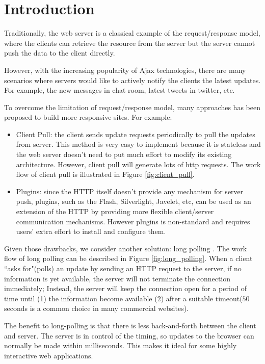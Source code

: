 \section {Introduction\\}
Traditionally, the web server is a classical example of the request/response 
model, where the clients can retrieve the resource from the server but the 
server cannot push the data to the client directly. 

However, with the increasing popularity of Ajax\cite{Ajax} technologies, there 
are many scenarios where servers would like to actively notify the clients the 
latest updates. For example, the new messages in chat room, latest tweets in 
twitter, etc.

To overcome the limitation of request/response model, many approaches has been 
proposed to build more responsive sites. For example:

\begin{itemize}
\item Client Pull: the client sends update requests periodically to pull the
updates from server. This method is very easy to implement because 
it is stateless and the web server doesn't need to put much effort to modify 
its existing architecture. However, client pull will generate lots of http requests.
The work flow of client pull is illustrated in Figure \ref{fig:client_pull}.

\item Plugins: since the HTTP itself doesn't provide any mechanism for server 
push, plugins, such as the Flash, Silverlight, Javelet, etc, can be used as an 
extension of the HTTP by providing more flexible client/server communication 
mechanisms. However plugins is non-standard and requires users' extra effort to 
install and configure them.
\end{itemize}

Given those drawbacks, we consider another solution: long polling
\cite{LongPolling}. The work flow of long polling can be described in Figure
\ref{fig:long_polling}. When a client ``asks for"(polls) an update by sending 
an HTTP request to the server, if no information is yet available, the 
server will not terminate the connection immediately; Instead, the server 
will keep the connection open for a period of time until (1) the information 
become available (2) after a suitable timeout($50$ seconds is a common choice
in many commercial websites).

The benefit to long-polling is that there is less back-and-forth between the 
client and server. The server is in control of the timing, so updates to the
browser can normally be made within milliseconds. This makes it ideal for 
some highly interactive web applications.

